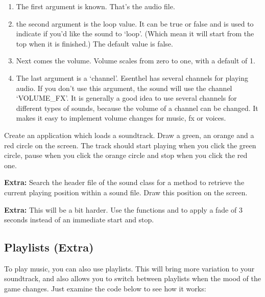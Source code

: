 \begin{enumerate}
\item The first argument is known. That's the audio file.
\item the second argument is the loop value. It can be true or false and is used to indicate if you'd like the sound to `loop'. (Which mean it will start from the top when it is finished.) The default value is false.
\item Next comes the volume. Volume scales from zero to one, with a default of 1.
\item The last argument is a `channel'. Esenthel has several channels for playing audio. If you don't use this argument, the sound will use the channel `VOLUME\_FX'. It is generally a good idea to use several channels for different types of sounds, because the volume of a channel can be changed. It makes it easy to implement volume changes for music, fx or voices.
\end{enumerate}

\begin{exercise}
Create an application which loads a soundtrack. Draw a green, an orange and a red circle on the screen. The track should start playing when you click the green circle, pause when you click the orange circle and stop when you click the red one.
\end{exercise}

\begin{exercise}
\textbf{Extra:} Search the header file of the sound class for a method to retrieve the current playing position within a sound file. Draw this position on the screen. 
\end{exercise}

\begin{exercise}
\textbf{Extra:} This will be a bit harder. Use the functions  and  to apply a fade of 3 seconds instead of an immediate start and stop.
\end{exercise}

\subsection{Playlists (Extra)}
To play music, you can also use playlists. This will bring more variation to your soundtrack, and also allows you to switch between playlists when the mood of the game changes. Just examine the code below to see how it works:

